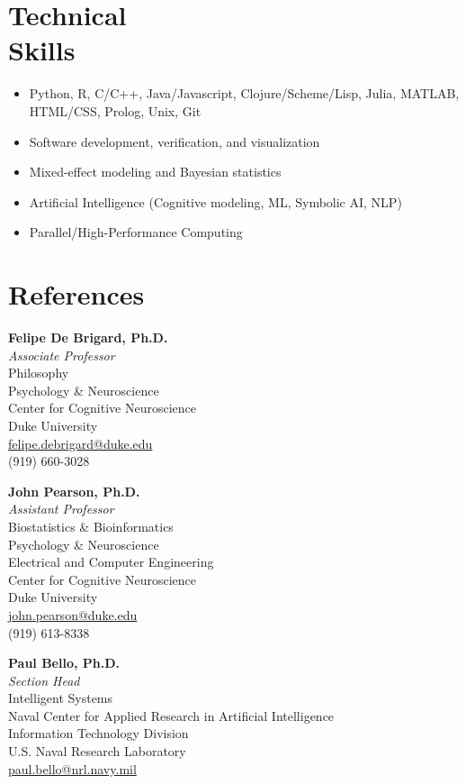 \documentclass[margin]{res}
\begin{document}
\begin{resume}
  \section{Technical\\Skills}
  \begin{itemize}
  \item Python, R, C/C++, Java/Javascript, Clojure/Scheme/Lisp, Julia, MATLAB, HTML/CSS, Prolog, Unix, Git
  \item Software development, verification, and visualization
  \item Mixed-effect modeling and Bayesian statistics
  \item Artificial Intelligence (Cognitive modeling, ML, Symbolic AI, NLP)
  \item Parallel/High-Performance Computing
  \end{itemize}

  \section{References}
  \textbf{Felipe De Brigard, Ph.D.}\\
  \emph{Associate Professor}\\
  Philosophy\\
  Psychology \& Neuroscience\\
  Center for Cognitive Neuroscience\\
  Duke University\\
  \href{mailto:felipe.debrigard@duke.edu}{felipe.debrigard@duke.edu} \\
  (919) 660-3028
  
  \textbf{John Pearson, Ph.D.}\\
  \emph{Assistant Professor}\\
  Biostatistics \& Bioinformatics\\
  Psychology \& Neuroscience\\
  Electrical and Computer Engineering\\
  Center for Cognitive Neuroscience\\
  Duke University\\
  \href{mailto:john.pearson@duke.edu}{john.pearson@duke.edu}\\
  (919) 613-8338

  \textbf{Paul Bello, Ph.D.}\\
  \emph{Section Head}\\
  Intelligent Systems\\
  Naval Center for Applied Research in Artificial Intelligence\\
  Information Technology Division\\
  U.S. Naval Research Laboratory\\
  \href{mailto:paul.bello@nrl.navy.mil}{paul.bello@nrl.navy.mil} 
  
\end{resume}
\end{document}
